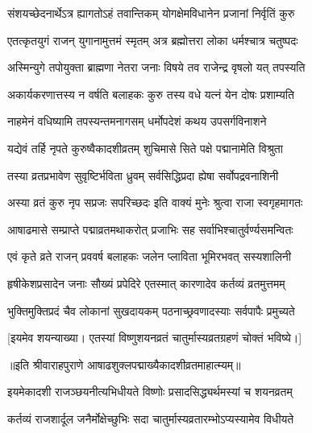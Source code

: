 \twolineshloka
{संशयच्छेदनार्थेऽत्र ह्यागतोऽहं तवान्तिकम्}
{योगक्षेमविधानेन प्रजानां निर्वृतिं कुरु} %


\twolineshloka
{एतत्कृतयुगं राजन् युगानामुत्तमं स्मृतम्}
{अत्र ब्रह्मोत्तरा लोका धर्मश्चात्र चतुष्पदः} %

\twolineshloka
{अस्मिन्युगे तपोयुक्ता ब्राह्मणा नेतरा जनाः}
{विषये तव राजेन्द्र वृषलो यत् तपस्यति} %

\twolineshloka
{अकार्यकरणात्तस्य न वर्षति बलाहकः}
{कुरु तस्य वधे यत्नं येन दोषः प्रशाम्यति} %


\twolineshloka
{नाहमेनं वधिष्यामि तपस्यन्तमनागसम्}
{धर्मोपदेशं कथय उपसर्गविनाशने} %


\twolineshloka
{यद्येवं तर्हि नृपते कुरुष्वैकादशीव्रतम्}
{शुचिमासे सिते पक्षे पद्मानामेति विश्रुता} %

\twolineshloka
{तस्या व्रतप्रभावेण सुवृष्टिर्भविता ध्रुवम्}
{सर्वसिद्धिप्रदा ह्येषा सर्वोपद्रवनाशिनी} %

\twolineshloka
{अस्या व्रतं कुरु नृप सप्रजः सपरिच्छदः}
{इति वाक्यं मुनेः श्रुत्वा राजा स्वगृहमागतः} %

\twolineshloka
{आषाढमासे सम्प्राप्ते पद्माव्रतमथाकरोत्}
{प्रजाभिः सह सर्वाभिश्चातुर्वर्ण्यसमन्वितः} %

\twolineshloka
{एवं कृते व्रते राजन् प्रववर्ष बलाहकः}
{जलेन प्लाविता भूमिरभवत् सस्यशालिनी} %

\twolineshloka
{हृषीकेशप्रसादेन जनाः सौख्यं प्रपेदिरे}
{एतस्मात् कारणादेव कर्तव्यं व्रतमुत्तमम्} %

\twolineshloka
{भुक्तिमुक्तिप्रदं चैव लोकानां सुखदायकम्}
{पठनाच्छ्रवणादस्याः सर्वपापैः प्रमुच्यते} %

[इयमेव शयन्याख्या। एतस्यां विष्णुशयनव्रतं चातुर्मास्यव्रतग्रहणं चोक्तं भविष्ये।]

॥इति श्रीवाराहपुराणे आषाढशुक्लपद्माख्यैकादशीव्रतमाहात्म्यम्॥


\hyperref[sec:ekadashi_mahatmyam_vrata_raja]{\closesub}
\clearpage

\label{sec:vrata-raja-ashadha-shukla-shayani-bhavishya}


\twolineshloka
{इयमेकादशी राजञ्छयनीत्यभिधीयते}
{विष्णोः प्रसादसिद्ध्यर्थमस्यां च शयनव्रतम्} %

\twolineshloka
{कर्तव्यं राजशार्दूल जनैर्मोक्षेच्छुभिः सदा}
{चातुर्मास्यव्रतारम्भोऽप्यस्यामेव विधीयते} %


